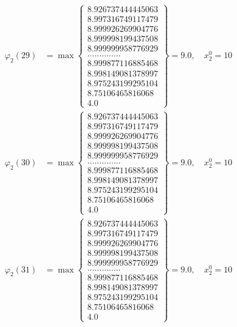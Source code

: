 \documentclass{article}
\begin{document}
\begin{align*}
  
  
  
\varphi_{2}(29) &= \max \left\{ \begin{array}{c}
8.926737444445063 \\
 8.997316749117479 \\
 8.999926269904776 \\
 8.999998199437508 \\
 8.999999958776929 \\
 .............. \\
 8.999877116885468 \\
 8.998149081378997 \\
 8.975243199295104 \\
 8.75106465816068 \\
 4.0
\end{array} \right\} = 9.0, \quad x_{2}^0 = 10\\
  
  
  
  
\varphi_{2}(30) &= \max \left\{ \begin{array}{c}
8.926737444445063 \\
 8.997316749117479 \\
 8.999926269904776 \\
 8.999998199437508 \\
 8.999999958776929 \\
 .............. \\
 8.999877116885468 \\
 8.998149081378997 \\
 8.975243199295104 \\
 8.75106465816068 \\
 4.0
\end{array} \right\} = 9.0, \quad x_{2}^0 = 10\\
  
  
  
  
\varphi_{2}(31) &= \max \left\{ \begin{array}{c}
8.926737444445063 \\
 8.997316749117479 \\
 8.999926269904776 \\
 8.999998199437508 \\
 8.999999958776929 \\
 .............. \\
 8.999877116885468 \\
 8.998149081378997 \\
 8.975243199295104 \\
 8.75106465816068 \\
 4.0
\end{array} \right\} = 9.0, \quad x_{2}^0 = 10\\
  

\end{align*}
\end{document}
